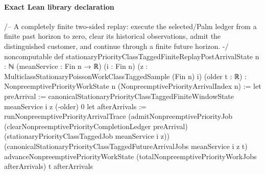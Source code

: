 \documentclass[10pt]{article}
\begin{document}
\paragraph{Exact Lean library declaration}
\begin{ReviewVerbatim}
/-- A completely finite two-sided replay: execute the selected/Palm ledger
from a finite past horizon to zero, clear its historical observations, admit
the distinguished customer, and continue through a finite future horizon. -/
noncomputable def stationaryPriorityClassTaggedFiniteReplayPostArrivalState
    {n : ℕ} (meanService : Fin n → ℝ) (i : Fin n)
    (z : MulticlassStationaryPoissonWorkClassTaggedSample (Fin n) i)
    (older t : ℝ) : NonpreemptivePriorityWorkState n (NonpreemptivePriorityArrivalIndex n) :=
  let preArrival := canonicalStationaryPriorityClassTaggedFiniteWindowState
    meanService i z (-older) 0
  let afterArrivals := runNonpreemptivePriorityArrivalTrace
    (admitNonpreemptivePriorityJob
      (clearNonpreemptivePriorityCompletionLedger preArrival)
      (stationaryPriorityClassTaggedJob meanService i z))
    (canonicalStationaryPriorityClassTaggedFutureArrivalJobs meanService i z t)
  advanceNonpreemptivePriorityWorkState
    (totalNonpreemptivePriorityWorkJobs afterArrivals) t afterArrivals
\end{ReviewVerbatim}
\end{document}
